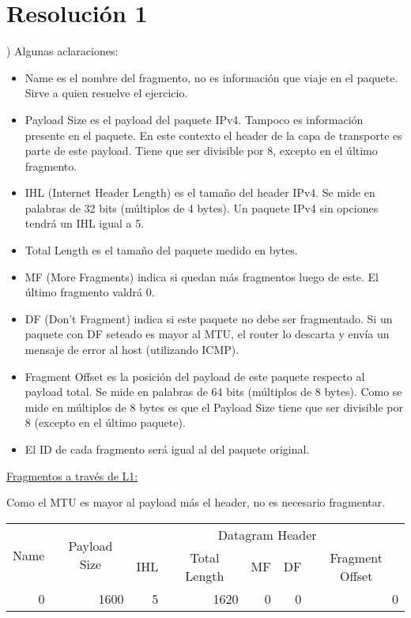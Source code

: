 \section*{Resolución 1}

) Algunas aclaraciones:

\begin{itemize}
    \item Name es el nombre del fragmento, no es información que viaje en el paquete. Sirve a quien resuelve el ejercicio.
    \item Payload Size es el payload del paquete IPv4. Tampoco es información presente en el paquete. En este contexto el header de la capa de transporte es parte de este payload. Tiene que ser divisible por 8, excepto en el último fragmento.
    \item IHL (Internet Header Length) es el tamaño del header IPv4. Se mide en palabras de 32 bits (múltiplos de 4 bytes). Un paquete IPv4 sin opciones tendrá un IHL igual a 5.
    \item Total Length es el tamaño del paquete medido en bytes.
    \item MF (More Fragments) indica si quedan más fragmentos luego de este. El último fragmento valdrá 0.
    \item DF (Don't Fragment) indica si este paquete no debe ser fragmentado. Si un paquete con DF seteado es mayor al MTU, el router lo descarta y envía un mensaje de error al host (utilizando ICMP).
    \item Fragment Offset es la posición del payload de este paquete respecto al payload total. Se mide en palabras de 64 bits (múltiplos de 8 bytes). Como se mide en múltiplos de 8 bytes es que el Payload Size tiene que ser divisible por 8 (excepto en el último paquete).
    \item El ID de cada fragmento será igual al del paquete original.
\end{itemize}


\noindent
\underline{Fragmentos a través de L1:}

\skipline
Como el MTU es mayor al payload más el header, no es necesario fragmentar.

\begin{table}[H]
    \renewcommand{\arraystretch}{1.5}
    \centering
    \begin{tabular}{|c|c|crrrr|}
    \hline
    \multirow{2}{*}{Name} & \multirow{2}{*}{Payload Size} & \multicolumn{5}{c|}{Datagram Header} \\ \cline{3-7} 
        &  & \multicolumn{1}{c|}{IHL} & \multicolumn{1}{c|}{Total Length} & \multicolumn{1}{c|}{MF} & \multicolumn{1}{c|}{DF} & \multicolumn{1}{c|}{Fragment Offset} \\ \hline
    \multicolumn{1}{|r|}{0} & \multicolumn{1}{r|}{1600} & \multicolumn{1}{r|}{5} & \multicolumn{1}{r|}{1620} & \multicolumn{1}{r|}{0} & \multicolumn{1}{r|}{0} & 0 \\ \hline
    \end{tabular}
\end{table}


